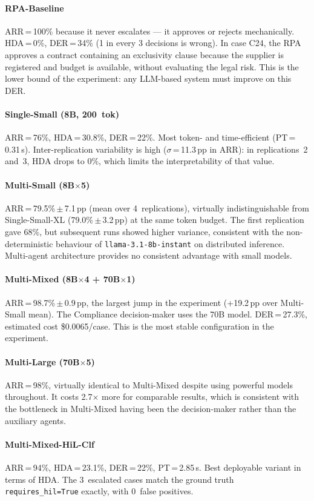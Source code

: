 \documentclass[preprint,12pt,numrefs]{elsarticle}
\begin{document}
\paragraph{RPA-Baseline}
ARR\,=\,100\% because it never escalates --- it approves or rejects
mechanically. HDA\,=\,0\%, DER\,=\,34\% (1 in every 3 decisions is
wrong). In case C24, the RPA approves a contract containing an
exclusivity clause because the supplier is registered and budget is
available, without evaluating the legal risk. This is the lower bound
of the experiment: any LLM-based system must improve on this DER.
\paragraph{Single-Small (8B, 200~tok)}
ARR\,=\,76\%, HDA\,=\,30.8\%, DER\,=\,22\%. Most token- and
time-efficient (PT\,=\,0.31\,s). Inter-replication variability is high
($\sigma$\,=\,11.3\,pp in ARR): in replications~2 and~3, HDA drops to
0\%, which limits the interpretability of that value.
\paragraph{Multi-Small (8B$\times$5)}
ARR\,=\,79.5\%\,$\pm$\,7.1\,pp (mean over 4~replications), virtually
indistinguishable from Single-Small-XL (79.0\%\,$\pm$\,3.2\,pp) at the
same token budget. The first replication gave 68\%, but subsequent runs
showed higher variance, consistent with the non-deterministic behaviour
of \texttt{llama-3.1-8b-instant} on distributed inference. Multi-agent
architecture provides no consistent advantage with small models.
\paragraph{Multi-Mixed (8B$\times$4 + 70B$\times$1)}
ARR\,=\,98.7\%\,$\pm$\,0.9\,pp, the largest jump in the experiment
(+19.2\,pp over Multi-Small mean). The Compliance decision-maker uses
the 70B model. DER\,=\,27.3\%, estimated cost \$0.0065/case. This is
the most stable configuration in the experiment.
\paragraph{Multi-Large (70B$\times$5)}
ARR\,=\,98\%, virtually identical to Multi-Mixed despite using powerful
models throughout. It costs 2.7$\times$ more for comparable results,
which is consistent with the bottleneck in Multi-Mixed having been the
decision-maker rather than the auxiliary agents.
\paragraph{Multi-Mixed-HiL-Clf}
ARR\,=\,94\%, HDA\,=\,23.1\%, DER\,=\,22\%, PT\,=\,2.85\,s. Best
deployable variant in terms of HDA. The 3~escalated cases match the
ground truth \texttt{requires\_hil=True} exactly, with 0~false
positives.
\end{document}
